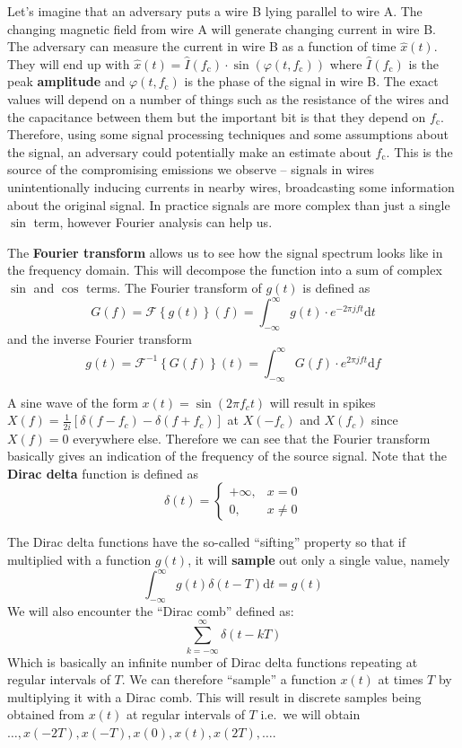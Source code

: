 \documentclass[a4paper,12pt,twoside,openright]{report}
\begin{document}
Let's imagine that an adversary puts a wire B lying parallel to wire A. The changing magnetic field from wire A will generate changing current in wire B. The adversary can measure the current in wire B as a function of time $\hat{x}(t)$. They will end up with $\hat{x}(t) = \hat{I}(f_\text{c}) \cdot \sin(\varphi(t, f_\text{c}))$ where $\hat{I}(f_\text{c})$ is the peak \textbf{amplitude} and $\varphi(t, f_\text{c})$ is the phase of the signal in wire B. The exact values will depend on a number of things such as the resistance of the wires and the capacitance between them but the important bit is that they depend on $f_\text{c}$. Therefore, using some signal processing techniques and some assumptions about the signal, an adversary could potentially make an estimate about $f_\text{c}$. This is the source of the compromising emissions we observe -- signals in wires unintentionally inducing currents in nearby wires, broadcasting some information about the original signal. In practice signals are more complex than just a single $\sin$ term, however Fourier analysis can help us.

The \textbf{Fourier transform} \cite{briggs1995dft} allows us to see how the signal spectrum looks like in the frequency domain. This will decompose the function into a sum of complex $\sin$ and $\cos$ terms. The Fourier transform of $g(t)$ is defined as
$$G(f)=\mathcal{F} \left\{ g(t) \right\} (f) = \int_{-\infty}^{\infty} g(t) \cdot e^{- 2 \pi j f t} \text{d} t $$
and the inverse Fourier transform
$$g(t) = \mathcal{F}^{-1} \left\{ G(f) \right\} (t) = \int_{-\infty}^{\infty} G(f) \cdot e^{2 \pi j f t} \text{d} f$$

A sine wave of the form $x(t) = \sin(2 \pi f_{c} t)$ will result in spikes $X(f) = \frac{1}{2 i} [\delta(f - f_{c}) - \delta(f
 + f_{c})]$ at $X(-f_{c})$ and $X(f_{c})$ since $X(f) = 0$ everywhere else. Therefore we can see that the Fourier transform basically gives an indication of the frequency of the source signal. Note that the \textbf{Dirac delta} function is defined as
$$ \delta(t) = \begin{cases} +\infty, & x = 0 \\ 0, & x \neq 0 \end{cases} $$

The Dirac delta functions have the so-called ``sifting'' property so that if multiplied with a function $g(t)$, it will \textbf{sample} out only a single value, namely
$$ \int_{-\infty}^{\infty} g(t) \delta(t - T) \text{d} t = g(t) $$
We will also encounter the ``Dirac comb'' defined as:
$$ \sum_{k=-\infty}^{\infty} \delta(t - kT) $$
Which is basically an infinite number of Dirac delta functions repeating at regular intervals of $T$. We can therefore ``sample'' a function $x(t)$ at times $T$ by multiplying it with a Dirac comb. This will result in discrete samples being obtained from $x(t)$ at regular intervals of $T$ i.e.\  we will obtain $\dots, x(-2 T), x(-T), x(0), x(t), x(2 T), \dots$.
\end{document}
